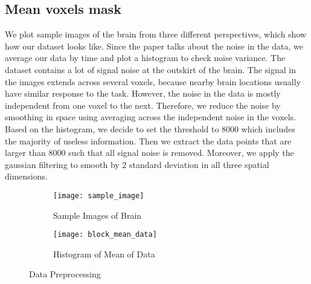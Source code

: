 \subsection{Mean voxels mask}

We plot sample images of the brain from three different perspectives, which 
show how our dataset looks like. Since the paper talks about the noise 
in the data, we average our data by time and plot a histogram to check noise 
variance. The dataset contains a lot of signal noise at the outskirt of the 
brain. The signal in the images extends across several voxels, because nearby 
brain locations usually have similar response to the task. However, the noise 
in the data is mostly independent from one voxel to the next. Therefore, we 
reduce the noise by smoothing in space using averaging across the independent 
noise in the voxels. Based on the histogram, we decide to set the threshold to 
8000 which includes the majority of useless information. Then we extract the data 
points that are larger than 8000 such that all signal noise is removed. Moreover, 
we apply the gaussian filtering to smooth by 2 standard deviation in all three spatial 
dimensions.

\begin{figure}[h]
\centering
\begin{subfigure}{.45\textwidth}
  \texttt{[image: sample\_image]}
  \caption{Sample Images of Brain}
  \label{fig:sub1}
\end{subfigure}%
\begin{subfigure}{.6\textwidth}
  \texttt{[image: block\_mean\_data]}
  \centering
  \caption{Histogram of Mean of Data}
  \label{fig:sub2}
\end{subfigure}
\caption{Data Preprocessing\label{fig:datapre}}
\end{figure}


